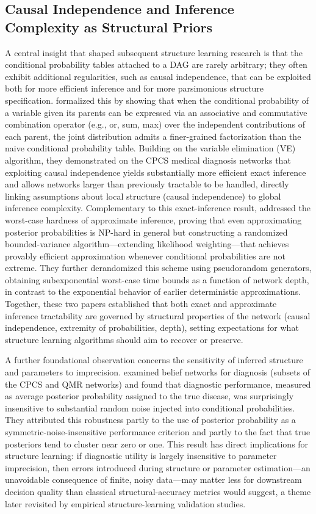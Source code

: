 \subsection{Causal Independence and Inference Complexity as Structural Priors}
A central insight that shaped subsequent structure learning research is that the conditional probability tables attached to a DAG are rarely arbitrary; they often exhibit additional regularities, such as causal independence, that can be exploited both for more efficient inference and for more parsimonious structure specification. \cite{zhang1996exploiting} formalized this by showing that when the conditional probability of a variable given its parents can be expressed via an associative and commutative combination operator (e.g., or, sum, max) over the independent contributions of each parent, the joint distribution admits a finer-grained factorization than the naive conditional probability table. Building on the variable elimination (VE) algorithm, they demonstrated on the CPCS medical diagnosis networks that exploiting causal independence yields substantially more efficient exact inference and allows networks larger than previously tractable to be handled, directly linking assumptions about local structure (causal independence) to global inference complexity. Complementary to this exact-inference result, \cite{dagum1997optimal} addressed the worst-case hardness of approximate inference, proving that even approximating posterior probabilities is NP-hard in general but constructing a randomized bounded-variance algorithm---extending likelihood weighting---that achieves provably efficient approximation whenever conditional probabilities are not extreme. They further derandomized this scheme using pseudorandom generators, obtaining subexponential worst-case time bounds as a function of network depth, in contrast to the exponential behavior of earlier deterministic approximations. Together, these two papers established that both exact and approximate inference tractability are governed by structural properties of the network (causal independence, extremity of probabilities, depth), setting expectations for what structure learning algorithms should aim to recover or preserve.

A further foundational observation concerns the sensitivity of inferred structure and parameters to imprecision. \cite{henrion2013why} examined belief networks for diagnosis (subsets of the CPCS and QMR networks) and found that diagnostic performance, measured as average posterior probability assigned to the true disease, was surprisingly insensitive to substantial random noise injected into conditional probabilities. They attributed this robustness partly to the use of posterior probability as a symmetric-noise-insensitive performance criterion and partly to the fact that true posteriors tend to cluster near zero or one. This result has direct implications for structure learning: if diagnostic utility is largely insensitive to parameter imprecision, then errors introduced during structure or parameter estimation---an unavoidable consequence of finite, noisy data---may matter less for downstream decision quality than classical structural-accuracy metrics would suggest, a theme later revisited by empirical structure-learning validation studies.

